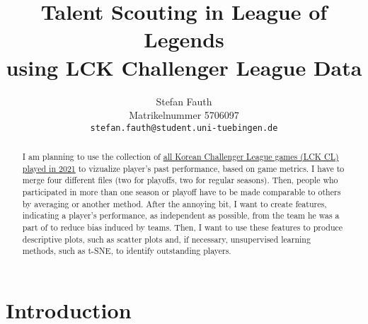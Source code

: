 \documentclass{article}
\title{Talent Scouting in League of Legends \\ using LCK Challenger League Data}
\author{%
  Stefan Fauth\\
  Matrikelnummer 5706097\\
  \texttt{stefan.fauth@student.uni-tuebingen.de}
}
\begin{document}
\maketitle

\begin{abstract}
I am planning to use the collection of \href{https://oracleselixir.com/stats/players/byTournament}{all Korean Challenger League games (LCK CL) played in 2021} to vizualize player's past performance, based on game metrics. I have to merge four different files (two for playoffs, two for regular seasons). Then, people who participated in more than one season or playoff have to be made comparable to others by averaging or another method. After the annoying bit, I want to create features, indicating a player's performance, as independent as possible, from the team he was a part of to reduce bias induced by teams. Then, I want to use these features to produce descriptive plots, such as scatter plots and, if necessary, unsupervised learning methods, such as t-SNE, to identify outstanding players.
\end{abstract}

\section{Introduction}
\end{document}

